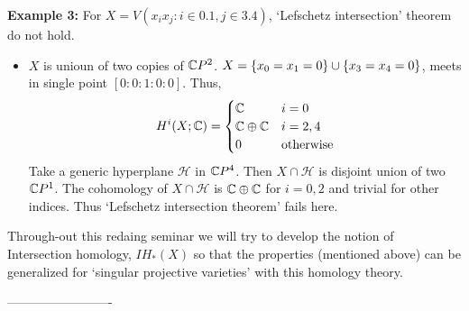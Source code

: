 \documentclass[11pt]{article}
\begin{document}
\pagebreak

\noindent \textbf{Example 3:} For $X = V(x_ix_j : i \in \qty{0,1}, j \in \qty{3,4})$, `Lefschetz intersection' theorem do not hold. 
\begin{itemize}
    \item[] $X$ is unioun of two copies of $\mathbb{C} P^2$. $X = \qty{x_0=x_1=0} \cup \qty{x_3=x_4=0}$, meets in single point $[0:0:1:0:0]$. Thus, \[
        H^i(X;\mathbb{C})=\begin{cases}
            \mathbb{C} & i=0\\
            \mathbb{C} \oplus \mathbb{C} & i=2,4 \\
            0  & \text{otherwise}
        \end{cases}
    \] 
    Take a generic hyperplane $\mathcal{H}$ in $\mathbb{C} P^4$. Then $X \cap \mathcal{H}$ is disjoint union of two  $\mathbb{C} P^1$. The cohomology of $X \cap \mathcal{H}$ is $\mathbb{C} \oplus \mathbb{C}$ for $i=0,2$ and trivial for other indices. Thus `Lefschetz intersection theorem' fails here.
\end{itemize}

\noindent \textcolor{darkcerulean}{Through-out this redaing seminar we will try to develop the notion of Intersection homology, $IH_{\ast}(X)$ so that the properties (mentioned above) can be generalized for `singular projective varieties' with this homology theory.}

\begin{center}
     ------------------------- 
\end{center}
\end{document}
